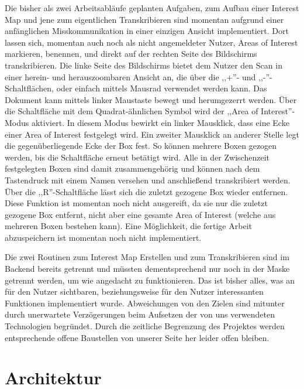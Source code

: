 \documentclass{article}
\begin{document}
Die bisher als zwei Arbeitsabläufe geplanten Aufgaben,
zum Aufbau einer Interest Map und jene zum eigentlichen Transkribieren sind momentan
aufgrund einer anfänglichen Misskommunikation in einer einzigen Ansicht implementiert.%
Dort lassen sich, momentan auch noch als nicht angemeldeter Nutzer,
Areas of Interest markieren, benennen, und direkt auf der rechten Seite des Bildschirms transkribieren.
Die linke Seite des Bildschirms bietet dem Nutzer den Scan in einer herein- und herauszoombaren Ansicht an, die über die ,,+''- und ,,-''-Schaltflächen,
oder einfach mittels Mausrad verwendet werden kann. Das Dokument kann mittels linker Maustaste bewegt und herumgezerrt werden.
Über die Schaltfläche mit dem Quadrat-ähnlichen Symbol wird der ,,Area of Interest''-Modus aktiviert.
In diesem Modus bewirkt ein linker Mausklick, dass eine Ecke einer Area of Interest festgelegt wird.
Ein zweiter Mausklick an anderer Stelle legt die gegenüberliegende Ecke der Box fest.
So können mehrere Boxen gezogen werden, bis die Schaltfläche erneut betätigt wird.
Alle in der Zwischenzeit festgelegten Boxen sind damit zusammengehörig und können nach dem Tastendruck mit einem Namen versehen und anschließend transkribiert werden.
Über die ,,R''-Schaltfläche lässt sich die zuletzt gezogene Box wieder entfernen.
Diese Funktion ist momentan noch nicht ausgereift, da sie nur die zuletzt gezogene Box entfernt,
nicht aber eine gesamte Area of Interest (welche aus mehreren Boxen bestehen kann).
Eine Möglichkeit, die fertige Arbeit abzuspeichern ist momentan noch nicht implementiert.

Die zwei Routinen zum Interest Map Erstellen und zum Transkribieren sind im Backend bereits getrennt
und müssten dementsprechend nur noch in der Maske getrennt werden, um wie angedacht zu funktionieren.
Das ist bisher alles, was an für den Nutzer sichtbaren, beziehungsweise für den Nutzer interessanten Funktionen implementiert wurde.
Abweichungen von den Zielen sind mitunter durch unerwartete Verzögerungen beim Aufsetzen der von uns verwendeten Technologien begründet.
Durch die zeitliche Begrenzung des Projektes werden entsprechende offene Baustellen von unserer Seite her leider offen bleiben.


\section{Architektur}
\end{document}
